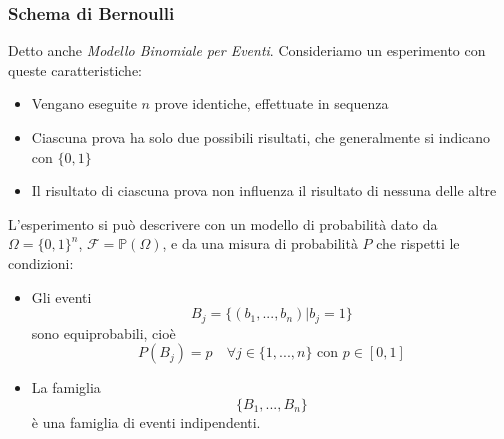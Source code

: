 \documentclass{article}
\theoremstyle{plain}
\theoremstyle{definition}
\theoremstyle{remark}
\begin{document}
\subsubsection{Schema di Bernoulli} %
\label{ssub:schema_di_bernoulli}
Detto anche \textit{Modello Binomiale per Eventi}. Consideriamo un esperimento con queste caratteristiche:
\begin{itemize}
	\item Vengano eseguite $n$ prove identiche, effettuate in sequenza
	\item Ciascuna prova ha solo due possibili risultati, che generalmente si indicano con $\{0,1\}$
	\item Il risultato di ciascuna prova non influenza il risultato di nessuna delle altre
\end{itemize}
L'esperimento si può descrivere con un modello di probabilità dato da $\Omega=\{0,1\}^n$, $\mathscr{F}=\mathds{P}(\Omega)$, e da una misura di probabilità $P$ che rispetti le condizioni:
\begin{itemize}
	\item Gli eventi
	\begin{equation*}
		B_j=\{(b_1,...,b_n)|b_j=1\}
	\end{equation*}
	sono equiprobabili, cioè
	\begin{equation*}
		P(B_j)=p\quad\forall j\in\{1,...,n\}\text{ con }p\in[0,1]
	\end{equation*}
	\item La famiglia
	\begin{equation*}
		\{B_1,...,B_n\}
	\end{equation*}
	è una famiglia di eventi indipendenti.
\end{itemize}
\end{document}
